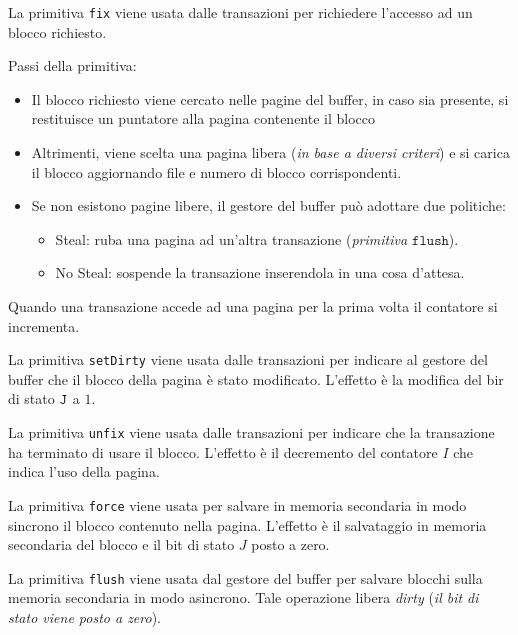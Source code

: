 \documentclass[oneside,a4paper,11pt]{book}
\theoremstyle{italicstyle}
\theoremstyle{normStyle}
\begin{document}
La primitiva \verb|fix| viene usata dalle transazioni per richiedere l'accesso 
ad un blocco richiesto.

Passi della primitiva:
\begin{itemize}
    \item Il blocco richiesto viene cercato nelle pagine del buffer, in caso sia presente, si restituisce 
    un puntatore alla pagina contenente il blocco
    \item Altrimenti, viene scelta una pagina libera (\textit{in base a diversi criteri}) 
    e si carica il blocco aggiornando 
    file e numero di blocco corrispondenti.
    \item Se non esistono pagine libere, il gestore del buffer può adottare due politiche:
    \begin{itemize}
        \item Steal: ruba una pagina ad un'altra transazione (\textit{primitiva $\texttt{flush}$}).
        \item No Steal: sospende la transazione inserendola in una cosa d'attesa.
    \end{itemize}
\end{itemize}
Quando una transazione accede ad una pagina per la prima volta il contatore 
si incrementa.

La primitiva \verb|setDirty| viene usata dalle transazioni per 
indicare al gestore del buffer che il blocco della pagina è stato 
modificato. L'effetto è la modifica del bir di stato $\verb|J|$ a $1$.

La primitiva \verb|unfix| viene usata dalle transazioni per indicare che 
la transazione ha terminato di usare il blocco. L'effetto è il decremento 
del contatore $I$ che indica l'uso della pagina.

La primitiva \verb|force| viene usata per salvare in memoria secondaria 
in modo sincrono il blocco contenuto nella pagina. L'effetto è il 
salvataggio in memoria secondaria del blocco e il bit di stato $J$ posto a zero.

La primitiva \verb|flush| viene usata dal gestore del buffer per 
salvare blocchi sulla memoria secondaria in modo asincrono. Tale 
operazione libera \textit{dirty} (\textit{il bit di stato 
viene posto a zero}).
\end{document}
